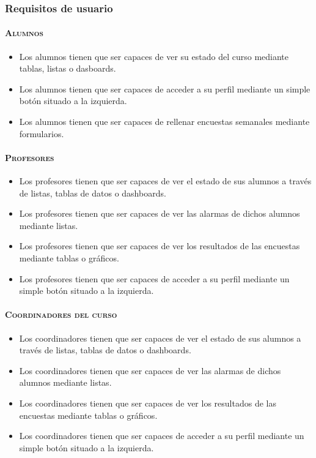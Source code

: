 \subsubsection{Requisitos de usuario}
\paragraph{\textsc {Alumnos}}
\begin{itemize}
\item {Los alumnos tienen que ser capaces de ver su estado del curso mediante tablas, listas o dasboards.}
\item {Los alumnos tienen que ser capaces de acceder a su perfil mediante un simple botón situado a la izquierda. }
\item {Los alumnos tienen que ser capaces de rellenar encuestas semanales mediante formularios.}
\end{itemize}
\paragraph{\textsc {Profesores}}
\begin{itemize}
\item {Los profesores tienen que ser capaces de ver el estado de sus alumnos a través de listas, tablas de datos o dashboards.}
\item {Los profesores tienen que ser capaces de ver las alarmas de dichos alumnos mediante listas.}
\item {Los profesores tienen que ser capaces de ver los resultados de las encuestas mediante tablas o gráficos.}
\item {Los profesores tienen que ser capaces de acceder a su perfil mediante un simple botón situado a la izquierda.}
\end{itemize}
\paragraph{\textsc {Coordinadores del curso}}
\begin{itemize}
\item {Los coordinadores tienen que ser capaces de ver el estado de sus alumnos a través de listas, tablas de datos o dashboards.}
\item {Los coordinadores tienen que ser capaces de ver las alarmas de dichos alumnos mediante listas.}
\item {Los coordinadores tienen que ser capaces de ver los resultados de las encuestas mediante tablas o gráficos.}
\item {Los coordinadores tienen que ser capaces de acceder a su perfil mediante un simple botón situado a la izquierda.}
\end{itemize}
